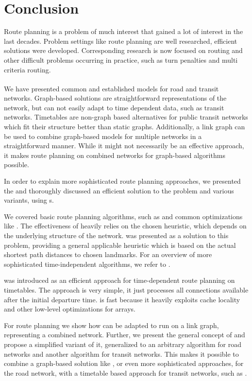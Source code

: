 \section{Conclusion}\label{conclusion}
	Route planning is a problem of much interest that gained a lot of interest in the last decades. Problem settings like \uniModal route planning are
	well researched, efficient solutions were developed. Corresponding research is now focused on \multiModal routing and other difficult problems
	occurring in practice, such as turn penalties and multi criteria routing.\\\\
	We have presented common and established models for road and transit networks. Graph-based solutions are straightforward representations of the network,
	but can not easily adapt to time dependent data, such as transit networks. Timetables are non-graph based alternatives for public transit networks
	which fit their structure better than static graphs. Additionally, a link graph can be used to combine graph-based models for multiple networks in a
	straightforward manner. While it might not necessarily be an effective approach, it makes route planning on combined networks for graph-based
	algorithms possible.
	
	In order to explain more sophisticated route planning approaches, we presented the \nearestNeighborProblem and thoroughly discussed an
	efficient solution to the problem and various variants, using {\coverTree}s.
	
	We covered basic route planning algorithms, such as \dijkstra and common optimizations like \astar. The effectiveness of \astar heavily relies on the chosen
	heuristic, which depends on the underlying structure of the network. \alt was presented as a solution to this problem, providing a general applicable heuristic
	which is based on the actual shortest path distances to chosen landmarks. For an overview of more sophisticated \uniModal time-independent
	algorithms, we refer to .
	
	\csa was introduced as an efficient approach for time-dependent route planning on timetables. The approach is very simple, it just processes all connections
	available after the initial departure time. \csa is fast because it heavily exploits cache locality  and other low-level optimizations
	for arrays.
	
	For \multiModal route planning we show how \dijkstra can be adapted to run on a link graph, representing a combined network. Further, we present the
	general concept of \anr and propose a simplified variant of it, generalized to an arbitrary algorithm for road networks and another algorithm for transit
	networks. This makes it possible to combine a graph-based solution like \dijkstra, or even more sophisticated approaches, for the road network,
	with a timetable based approach for transit networks, such as \csa.
	
